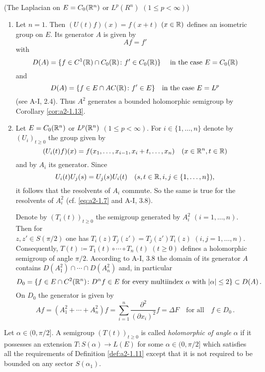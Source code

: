 \begin{example*}\label{ex:a2-1.13-kgk}(The Laplacian on $E = C_{0}(\mathbb{R}^{n})$ or $L^{p}(R^{n})$ $(1 \leq p < \infty)$)
\begin{enumerate}[\upshape (i), wide, labelsep=.5em]
\item \label{ex:a2-1.13-kgk-1}
Let $n = 1$.
Then $(U(t)f)(x) = f(x+t)$ $(x \in \mathbb{R})$ defines an isometric group on $E$.
Its generator $A$ is given by 
\[
Af = f'
\]  
with
\[
D(A) = \{f \in C^{1}(\mathbb{R}) \cap C_{0}(\mathbb{R}) \colon f' \in C_{0}(\mathbb{R})\}
\quad \text{ in the case } E = C_{0}(\mathbb{R})
\]
and
\[
D(A) = \{f \in E \cap AC(\mathbb{R}) \colon f' \in E\} \quad \text{in the case } E = L^{p}
\] 
(see A-I, 2.4).
Thus $A^{2}$ generates a bounded holomorphic semigroup by Corollary \ref{cor:a2-1.13}. 
\item \label{ex:a2-1.13-kgk-2}
Let $E = C_{0}(\mathbb{R}^{n})$ or $L^{p}(\mathbb{R}^{n})$ $(1 \leq p < \infty)$.
For $i \in \{1,\ldots,n\}$ denote by $(U_{i})_{t \geq 0}$ the group given by 
\[
(U_{i}(t)f)(x) = f(x_{1},\ldots,x_{i-1},x_{i}+t,\ldots,x_{n}) \quad  (x \in \mathbb{R}^{n}, t \in \mathbb{R})
\]
and by $A_{i}$ its generator.
Since 
\[U_{i}(t)U_{j}(s) = U_{j}(s)U_{i}(t) \quad (s,t \in \mathbb{R}, i,j \in \{1,\ldots,n\}), 
\]
it follows that the resolvents of $A_{i}$ commute.
So the same is true for the resolvents of $A_{i}^{2}$ (cf. \eqref{eq:a2-1.7} and A-I, 3.8). 

Denote by $(T_{i}(t))_{t \geq 0}$ 
the semigroup generated by $A_{i}^{2}$ $(i=1,\ldots,n)$.
Then for \\
$z,z' \in S(\pi/2)$ one has $T_{i}(z)T_{j}(z') = T_{j}(z')T_{i}(z)$ $(i,j=1,\ldots,n)$.
Consequently, $T(t) \coloneqq T_{1}(t) \circ \cdots \circ T_{n}(t)$ $(t \geq 0)$ defines a holomorphic semigroup of angle $\pi/2$.
According to A-I, 3.8 the domain of its generator $A$ contains $D(A_{1}^{2}) \cap \cdots \cap D(A_{n}^{2})$ and, in particular
\[
D_{0} = \{f \in E \cap C^{2}(\mathbb{R}^{n}) \colon D^{\alpha}f \in E \text{ for every multiindex } \alpha \text{ with } |\alpha| \leq 2\} \subset D(A)\,.
\]
On $D_{0}$ the generator is given by
\[
    Af = (A_{1}^{2} + \cdots + A_{n}^{2})f =
    \sum_{i = 1}^{n} \frac{\partial^{2}}{(\partial x_{i})^{2}} f
    = \Delta F \quad \text{for all} \quad f \in D_{0}\,.
\]
\end{enumerate}
\end{example*}
\smallskip
Let $\alpha \in (0,\pi/2]$.
A semigroup $(T(t))_{t \geq 0}$ is called \emph{holomorphic of angle} $\alpha$ if it possesses an extension $T \colon S(\alpha) \to L(E)$ for some $\alpha \in (0,\pi/2]$ which satisfies all the requirements of Definition \ref{def:a2-1.11} except that it is not required to be bounded on any sector $S(\alpha_{1})$.
